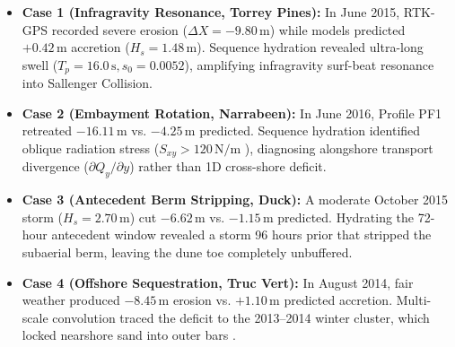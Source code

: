 \documentclass[journal]{IEEEtran}
\begin{document}
\begin{itemize}
    \setlength{\itemsep}{0.5pt}\setlength{\parskip}{0pt}
    \item \textbf{Case 1 (Infragravity Resonance, Torrey Pines):} In June 2015, RTK-GPS recorded severe erosion ($\Delta X = -9.80\,\text{m}$) \cite{ludka2015beach} while models predicted $+0.42\,\text{m}$ accretion ($H_s = 1.48\,\text{m}$). Sequence hydration revealed ultra-long swell ($T_p = 16.0\,\text{s}, s_0 = 0.0052$), amplifying infragravity surf-beat resonance into Sallenger Collision.
    \item \textbf{Case 2 (Embayment Rotation, Narrabeen):} In June 2016, Profile PF1 retreated $-16.11\,\text{m}$ \cite{turner2016multidecade} vs. $-4.25\,\text{m}$ predicted. Sequence hydration identified oblique radiation stress ($S_{xy} > 120\,\text{N/m}$ \cite{longuethiggins1964radiation}), diagnosing alongshore transport divergence ($\partial Q_y / \partial y$) rather than 1D cross-shore deficit.
    \item \textbf{Case 3 (Antecedent Berm Stripping, Duck):} A moderate October 2015 storm ($H_s = 2.70\,\text{m}$) cut $-6.62\,\text{m}$ \cite{birkemeier1985users} vs. $-1.15\,\text{m}$ predicted. Hydrating the 72-hour antecedent window revealed a storm 96 hours prior that stripped the subaerial berm, leaving the dune toe completely unbuffered.
    \item \textbf{Case 4 (Offshore Sequestration, Truc Vert):} In August 2014, fair weather produced $-8.45\,\text{m}$ erosion vs. $+1.10\,\text{m}$ predicted accretion. Multi-scale convolution traced the deficit to the 2013--2014 winter cluster, which locked nearshore sand into outer bars \cite{castelle2020planshape}.
\end{itemize}
\end{document}
